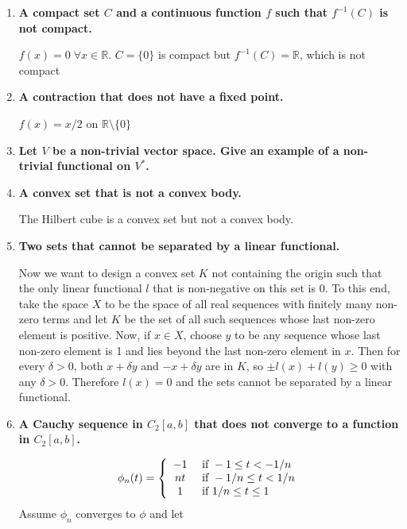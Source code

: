 \documentclass[5pt,letterpaper,reqno]{amsart}
\newcommand{\R}{\mathbb R}
\begin{document}
\begin{enumerate}[1.]
\begin{flushleft}
\end{flushleft}
\item \textbf{A compact set $C$ and a continuous function $f$ such that $f^{-1}(C)$ is not compact.}
\begin{flushleft}
    $f(x) = 0 \; \forall x \in \R$. $C = \{0\}$ is compact but $f^{-1}(C) = \R$, which is not compact
\end{flushleft}
\item \textbf{A contraction that does not have a fixed point.}
\begin{flushleft}
    $f(x) = x/2$ on $\R\setminus\{0\}$
\end{flushleft}
\item \textbf{Let $V$ be a non-trivial vector space. Give an example of a non-trivial functional on $V^*$.}
\item \textbf{A convex set that is not a convex body.}
\begin{flushleft}
    The Hilbert cube is a convex set but not a convex body.
\end{flushleft}
\item \textbf{Two sets that cannot be separated by a linear functional.}
\begin{flushleft}
    Now we want to design a convex set $K$ not containing the origin such that the only linear functional $l$ that is non-negative on this set is 0. To this end, take the space $X$ to be the space of all real sequences with finitely many non-zero terms and let $K$ be the set of all such sequences whose last non-zero element is positive. Now, if $x \in X$, choose $y$ to be any sequence whose last non-zero element is 1 and lies beyond the last non-zero element in $x$. Then for every $\delta > 0$, both $x+\delta y$ and $-x+\delta y$ are in $K$, so $\pm l(x) + l(y) \geq 0$ with any $\delta > 0$. Therefore $l(x) = 0$ and the sets cannot be separated by a linear functional.
\end{flushleft}
\item \textbf{A Cauchy sequence in $C_2[a,b]$ that does not converge to a function in $C_2[a,b]$.}
\begin{flushleft}
    $$\phi _ { n } ( t ) = \left\{ \begin{array} { c l } { - 1 } & { \text { if } - 1 \leq t < - 1 / n } \\ { n t } & { \text { if } - 1 / n \leq t < 1 / n } \\ { 1 } & { \text { if } 1 / n \leq t \leq 1 } \end{array} \right.$$
    Assume $\phi_n$ converges to $\phi$ and let

\end{flushleft}
\end{enumerate}
\end{document}
